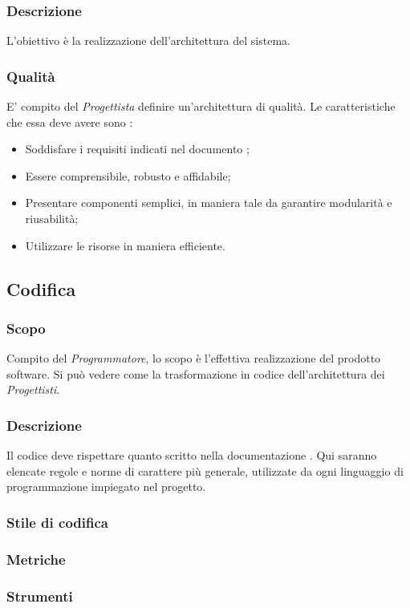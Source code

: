 \subsubsection{Descrizione}
L’obiettivo è la realizzazione dell’architettura del sistema.

\subsubsection{Qualità}
E’ compito del \textit{Progettista} definire un’architettura di qualità. Le caratteristiche che essa deve avere sono :
\begin{itemize}
  \item Soddisfare i requisiti indicati nel documento \AdR;
  \item Essere comprensibile, robusto e affidabile;
  \item Presentare componenti semplici, in maniera tale da garantire modularità e riusabilità;
  \item Utilizzare le risorse in maniera efficiente.
\end{itemize}

\subsection{Codifica}
\subsubsection{Scopo}
Compito del \textit{Programmatore}, lo scopo è l’effettiva realizzazione del prodotto software. Si può vedere come la trasformazione in codice dell’architettura dei \textit{Progettisti}.

\subsubsection{Descrizione}
Il codice deve rispettare quanto scritto nella documentazione \PdQ. Qui saranno elencate regole e norme di carattere più generale, utilizzate da ogni linguaggio di programmazione impiegato nel progetto.

\subsubsection{Stile di codifica}
\subsubsection{Metriche}
\subsubsection{Strumenti}
